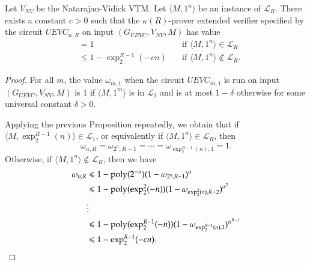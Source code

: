 \begin{corollary}
\label{cor:recursive_enl}
Let $V_{NV}$ be the Natarajan-Vidick VTM. Let $\langle M,1^n \rangle$ be an instance of $\mathcal{L}_R$. There exists a constant $c > 0$ such that the $\kappa(R)$-prover extended verifier specified by the circuit $UEVC_{n,R}$ on input $(G_{UEVC},V_{NV},M)$ has value 
\begin{align*}
		&= 1  \quad & \text{if } \langle M,1^n \rangle\in \mathcal{L}_R \\
		&\leq 1 - \exp^{R-1}_2(-cn) \quad &\text{if } \langle M,1^n \rangle\notin \mathcal{L}_R.
\end{align*}
\end{corollary}
\begin{proof}
	For all $m$, the value $\omega_{m,1}$ when the circuit $UEVC_{m,1}$ is run on input $(G_{UEVC},V_{NV},M)$ is $1$ if $\langle M,1^m \rangle$ is in $\mathcal{L}_1$ and is at most $1 - \delta$ otherwise for some universal constant $\delta > 0$.
	
	Applying the previous Proposition repeatedly, we obtain that if $\langle M,\exp^{R-1}_2(n) \rangle \in \mathcal{L}_1$, or equivalently if $\langle M,1^n \rangle \in \mathcal{L}_R$, then
	\[
		\omega_{n,R} = \omega_{2^n,R-1} = \cdots = \omega_{\exp^{R-1}_2(n),1} = 1.
	\]
	Otherwise, if  $\langle M,1^n \rangle \notin \mathcal{L}_R$, then we have
	\begin{align*}
		\omega_{n,R} &\leqslant 1 - \operatorname{poly}(2^{-n})(1-\omega_{2^n,R-1})^\alpha \\
					&\leqslant 1 - \operatorname{poly}(\exp^2_2(-n))(1- \omega_{\exp^2_2(n),R-2})^{\alpha^2} \\
					&\vdots \\
					&\leqslant 1 - \operatorname{poly}(\exp^{R-1}_2(-n))(1-\omega_{\exp^{R-1}_2(n),1})^{\alpha^{R-1}} \\
					&\leqslant 1 - \exp^{R-1}_2(-cn).
	\end{align*}
\end{proof}


